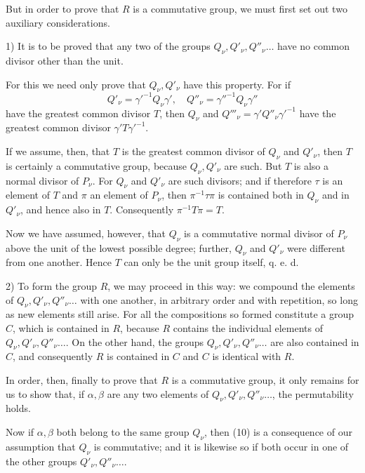 But in order to prove that $R$ is a commutative group, we must first set out two auxiliary considerations.

1) It is to be proved that any two of the groups $Q_\nu, Q'_\nu, Q''_\nu \ldots$ have no common divisor other than the unit.

For this we need only prove that $Q_\nu, Q'_\nu$ have this property. For if
\[ Q'_\nu = \gamma'^{-1} Q_\nu \gamma', \quad Q''_\nu = \gamma''^{-1} Q_\nu \gamma'' \]
have the greatest common divisor $T$, then $Q_\nu$ and $Q'''_\nu = \gamma' Q''_\nu \gamma'^{-1}$ have the greatest common divisor $\gamma' T \gamma'^{-1}$.

If we assume, then, that $T$ is the greatest common divisor of $Q_\nu$ and $Q'_\nu$, then $T$ is certainly a commutative group, because $Q_\nu, Q'_\nu$ are such. But $T$ is also a normal divisor of $P_\nu$. For $Q_\nu$ and $Q'_\nu$ are such divisors; and if therefore $\tau$ is an element of $T$ and $\pi$ an element of $P_\nu$, then $\pi^{-1}\tau\pi$ is contained both in $Q_\nu$ and in $Q'_\nu$, and hence also in $T$. Consequently $\pi^{-1} T \pi = T$.

Now we have assumed, however, that $Q_\nu$ is a commutative normal divisor of $P_\nu$ above the unit of the lowest possible degree; further, $Q_\nu$ and $Q'_\nu$ were different from one another. Hence $T$ can only be the unit group itself, q. e. d.

2) To form the group $R$, we may proceed in this way: we compound the elements of $Q_\nu, Q'_\nu, Q''_\nu \ldots$ with one another, in arbitrary order and with repetition, so long as new elements still arise. For all the compositions so formed constitute a group $C$, which is contained in $R$, because $R$ contains the individual elements of $Q_\nu, Q'_\nu, Q''_\nu \ldots$. On the other hand, the groups $Q_\nu, Q'_\nu, Q''_\nu \ldots$ are also contained in $C$, and consequently $R$ is contained in $C$ and $C$ is identical with $R$.

In order, then, finally to prove that $R$ is a commutative group, it only remains for us to show that, if $\alpha, \beta$ are any two elements of $Q_\nu, Q'_\nu, Q''_\nu \ldots$, the permutability
holds.

Now if $\alpha, \beta$ both belong to the same group $Q_\nu$, then (10) is a consequence of our assumption that $Q_\nu$ is commutative; and it is likewise so if both occur in one of the other groups $Q'_\nu, Q''_\nu \ldots$.
